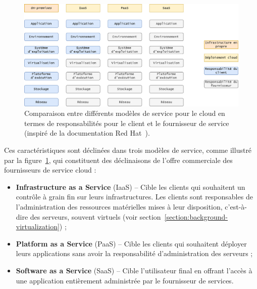 \begin{figure}[!ht]
    \centering
	\includegraphics[width=\textwidth]{2_Chapitre2/figures/service-models.png}
	\caption[Comparaison entre différents modèles de service pour le cloud en termes de responsabilités pour le client et le fournisseur de service.]{Comparaison entre différents modèles de service pour le cloud en termes de responsabilités pour le client et le fournisseur de service (inspiré de la documentation Red Hat~{\protect \footnotemark}).}
	\label{figure:context-service-model}
\end{figure}


Ces caractéristiques sont déclinées dans trois modèles de service, comme illustré par la figure~\ref{figure:context-service-model}, qui constituent des déclinaisons de l'offre commerciale des fournisseurs de service cloud :

\begin{itemize}
    \item \textbf{Infrastructure as a Service} (\gls{IaaS}) -- Cible les clients qui souhaitent un contrôle à grain fin sur leurs infrastructures. Les clients sont responsables de l'administration des ressources matérielles mises à leur disposition, c'est-à-dire des serveurs, souvent virtuels (voir section~\ref{section:background-virtualization}) ;
    \item \textbf{Platform as a Service} (\gls{PaaS}) -- Cible les clients qui souhaitent déployer leurs applications sans avoir la responsabilité d'administration des serveurs ;
    \item \textbf{Software as a Service} (\gls{SaaS}) -- Cible l'utilisateur final en offrant l'accès à une application entièrement administrée par le fournisseur de services.
\end{itemize}


